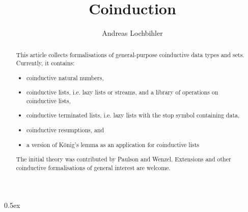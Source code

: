 \documentclass[11pt,a4paper]{article}
\begin{document}
\title{Coinduction}
\author{Andreas Lochbihler}
\maketitle

\begin{abstract}
This article collects formalisations of general-purpose coinductive data
types and sets. Currently, it contains:
\begin{itemize}
\item coinductive natural numbers,
\item coinductive lists, i.e. lazy lists or streams, and a library of operations on coinductive lists,
\item coinductive terminated lists, i.e. lazy lists with the stop symbol containing data,
\item coinductive resumptions, and
\item a version of K\"onig's lemma as an application for coinductive lists
\end{itemize}

The initial theory was contributed by Paulson and Wenzel.  Extensions
and other coinductive formalisations of general interest are welcome.
\end{abstract}

\tableofcontents

\parindent 0pt\parskip 0.5ex

\pagebreak



%
%
\end{document}
